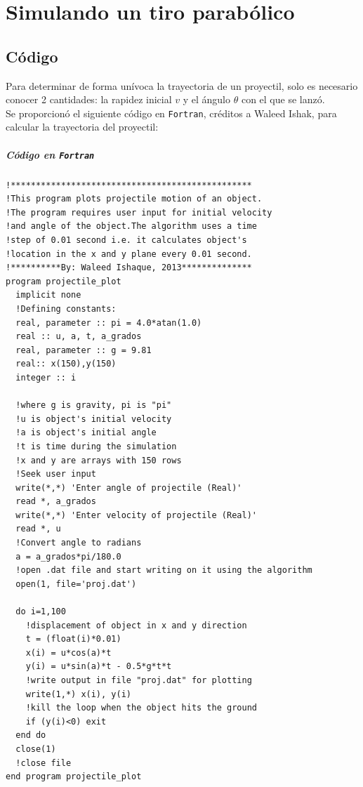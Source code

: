 \documentclass[a4paper]{article}
\begin{document}
\section{Simulando un tiro parabólico}
  \subsection{Código}

    Para determinar de forma unívoca la trayectoria de un proyectil, solo es necesario conocer 2 cantidades: la rapidez inicial $v$ y el ángulo $\theta$ con el que se lanzó.\\

Se proporcionó el siguiente código en \texttt{Fortran}, créditos a Waleed Ishak, para calcular la trayectoria del proyectil:
    
    \subparagraph{Código en \texttt{Fortran}}
      \begin{verbatim}
!************************************************  
!This program plots projectile motion of an object.  
!The program requires user input for initial velocity   
!and angle of the object.The algorithm uses a time   
!step of 0.01 second i.e. it calculates object's  
!location in the x and y plane every 0.01 second.  
!**********By: Waleed Ishaque, 2013**************  
program projectile_plot  
  implicit none  
  !Defining constants:  
  real, parameter :: pi = 4.0*atan(1.0) 
  real :: u, a, t, a_grados  
  real, parameter :: g = 9.81  
  real:: x(150),y(150)  
  integer :: i 

  !where g is gravity, pi is "pi"   
  !u is object's initial velocity   
  !a is object's initial angle   
  !t is time during the simulation   
  !x and y are arrays with 150 rows   
  !Seek user input   
  write(*,*) 'Enter angle of projectile (Real)'   
  read *, a_grados   
  write(*,*) 'Enter velocity of projectile (Real)'   
  read *, u   
  !Convert angle to radians   
  a = a_grados*pi/180.0   
  !open .dat file and start writing on it using the algorithm   
  open(1, file='proj.dat')   
 
  do i=1,100   
    !displacement of object in x and y direction   
    t = (float(i)*0.01)   
    x(i) = u*cos(a)*t   
    y(i) = u*sin(a)*t - 0.5*g*t*t   
    !write output in file "proj.dat" for plotting   
    write(1,*) x(i), y(i)   
    !kill the loop when the object hits the ground   
    if (y(i)<0) exit   
  end do   
  close(1)   
  !close file   
end program projectile_plot 
      \end{verbatim}
      
\end{document}
